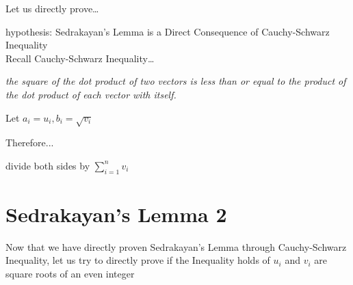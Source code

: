 \documentclass[12pt, a4paper]{article}
\begin{document}
\raggedright
Let us directly prove\dots

\vspace{0.5cm}
hypothesis: Sedrakayan's Lemma is a Direct Consequence of
Cauchy-Schwarz Inequality\\

\vspace{0.5cm}
Recall Cauchy-Schwarz Inequality\dots


\textit{the square of the dot product of two vectors is less than or equal to the product of the dot product of each vector with itself.}

\vspace{0.5cm}
\raggedright
Let $a_i = u_i, b_i = \sqrt{v_i}$

\centering{\fontsize{17}{18}\selectfont

\[
  |<a,b>|^{2}\space = (\sum_{i = 1}^{n}a_ib_i)^{2} = (\sum_{i = 1}^{n}u_i \sqrt{v_i})^{2}
\]
\[
  <a,a>\space<b,b>\space = (\sum_{i = 1}^{n}a_i^{2})(\sum_{i = 1}^{n}b_i^{2}) = (\sum_{i = 1}^{n} u_i^{2})(\sum_{i = 1}^{n}v_i)
\]
}

\vspace{0.5cm}
\raggedright
Therefore...

\centering{\fontsize{17}{18}\selectfont

\[
  (\sum_{i = 1}^{n}u_i \sqrt{v_i})^{2} \leq (\sum_{i = 1}^{n} u_i^{2})(\sum_{i = 1}^{n}v_i)
\]
}

\vspace{0.5cm}
\raggedright
divide both sides by $\sum_{i=1}^{n}v_i$


\newpage
\raggedright
\section{Sedrakayan's Lemma 2}

Now that we have directly proven Sedrakayan's Lemma through
Cauchy-Schwarz Inequality, let us try to directly prove if the
Inequality holds of $u_i$ and $v_i$ are square roots of an even
integer
\end{document}
